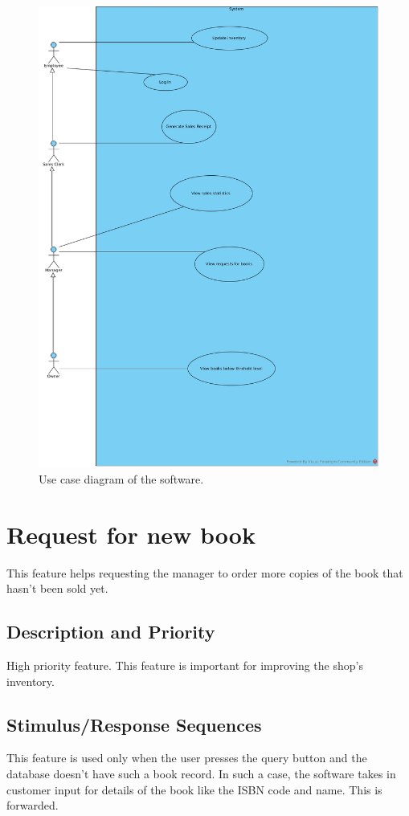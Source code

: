 \documentclass{scrreprt}
\begin{document}
\begin{figure}
  \includegraphics[width=\linewidth]{General Employee.jpg}
  \caption{Use case diagram of the software.}
  \label{fig:usecase}
\end{figure}

\section{Request for new book}

This feature helps requesting the manager to order more copies of the book that hasn't been sold yet. 
\subsection{Description and Priority}
High priority feature. This feature is important for improving the shop's inventory.

\subsection{Stimulus/Response Sequences}
This feature is used only when the user presses the query button and the database doesn't have such a book record. In such a case, the software takes in customer input for details of the book like the ISBN code and name. This is forwarded.
\end{document}
